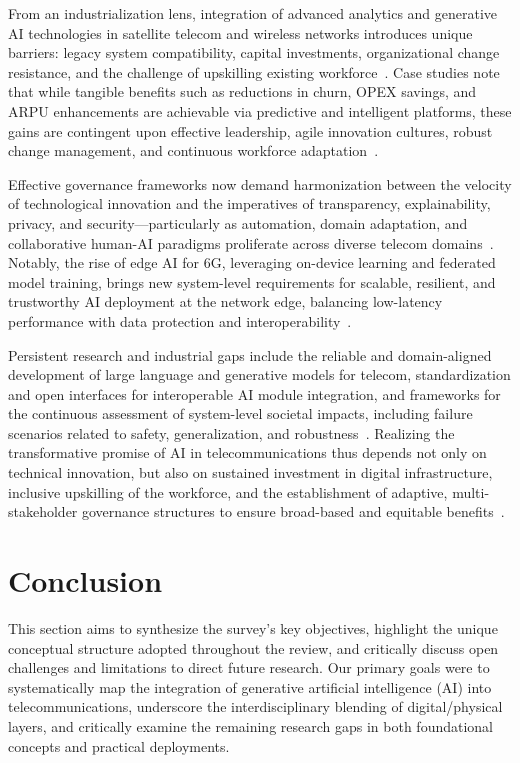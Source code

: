 \documentclass[sigconf]{acmart}
\begin{document}
From an industrialization lens, integration of advanced analytics and generative AI technologies in satellite telecom and wireless networks introduces unique barriers: legacy system compatibility, capital investments, organizational change resistance, and the challenge of upskilling existing workforce~\cite{ref19, ref26}. Case studies note that while tangible benefits such as reductions in churn, OPEX savings, and ARPU enhancements are achievable via predictive and intelligent platforms, these gains are contingent upon effective leadership, agile innovation cultures, robust change management, and continuous workforce adaptation~\cite{ref19}.

Effective governance frameworks now demand harmonization between the velocity of technological innovation and the imperatives of transparency, explainability, privacy, and security—particularly as automation, domain adaptation, and collaborative human-AI paradigms proliferate across diverse telecom domains~\cite{ref19, ref26, ref49}. Notably, the rise of edge AI for 6G, leveraging on-device learning and federated model training, brings new system-level requirements for scalable, resilient, and trustworthy AI deployment at the network edge, balancing low-latency performance with data protection and interoperability~\cite{ref49}.

Persistent research and industrial gaps include the reliable and domain-aligned development of large language and generative models for telecom, standardization and open interfaces for interoperable AI module integration, and frameworks for the continuous assessment of system-level societal impacts, including failure scenarios related to safety, generalization, and robustness~\cite{ref19, ref26, ref49}. Realizing the transformative promise of AI in telecommunications thus depends not only on technical innovation, but also on sustained investment in digital infrastructure, inclusive upskilling of the workforce, and the establishment of adaptive, multi-stakeholder governance structures to ensure broad-based and equitable benefits~\cite{ref8, ref19, ref26, ref29, ref49}.

\section{Conclusion}

This section aims to synthesize the survey’s key objectives, highlight the unique conceptual structure adopted throughout the review, and critically discuss open challenges and limitations to direct future research. Our primary goals were to systematically map the integration of generative artificial intelligence (AI) into telecommunications, underscore the interdisciplinary blending of digital/physical layers, and critically examine the remaining research gaps in both foundational concepts and practical deployments.
\end{document}

